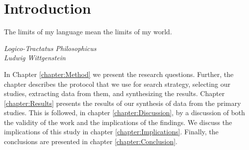 \chapter{Introduction}\label{chapter:Introduction}

\epigraph{The limits of my language mean the limits of my world.}{\textit{Logico-Tractatus Philosophicus\\Ludwig Wittgenstein}}

In Chapter \ref{chapter:Method} we present the research questions.
Further, the chapter describes the protocol that we use for search strategy, selecting our studies, extracting data from them, and synthesizing the results.
Chapter \ref{chapter:Results} presents the results of our synthesis of data from the primary studies.
This is followed, in chapter \ref{chapter:Discussion}, by a discussion of both the validity of the work and the implications of the findings.
We discuss the implications of this study in chapter \ref{chapter:Implications}.
Finally, the conclusions are presented in chapter \ref{chapter:Conclusion}. 

